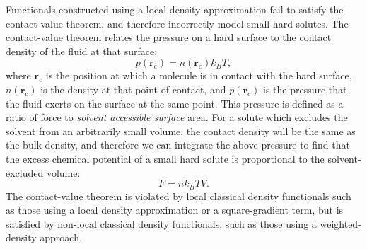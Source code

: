 \documentclass[twocolumn,amsmath,amssymb,prl]{revtex4-1}
\newcommand{\rr}{\textbf{r}}
\begin{document}

Functionals constructed using a local density approximation fail to
satisfy the contact-value theorem, and therefore incorrectly model
small hard solutes.  The contact-value theorem relates the pressure on
a hard surface to the contact density of the fluid at that
surface:
\begin{equation}\label{eq:contact}
  p(\rr_c) = n(\rr_c)k_BT,
\end{equation}
where $\rr_c$ is the position at which a molecule is in contact with
the hard surface, $n(\rr_c)$ is the density at that point of contact,
and $p(\rr_c)$ is the pressure that the fluid exerts on the surface at
the same point.  This pressure is defined as a ratio of force to
\emph{solvent accessible surface} area.
%
For a solute which excludes the solvent from an arbitrarily small
volume, the contact density will be the same as the bulk density, and
therefore we can integrate the above pressure to find that the excess
chemical potential of a small hard solute is proportional to the
solvent-excluded volume:
\begin{equation}\label{contactvaluethm}
  F = n k_BT V.
\end{equation}
The contact-value theorem is violated by local classical density
functionals such as those using a local density approximation or a
square-gradient term, but is satisfied by non-local classical density
functionals, such as those using a weighted-density approach.
\end{document}
